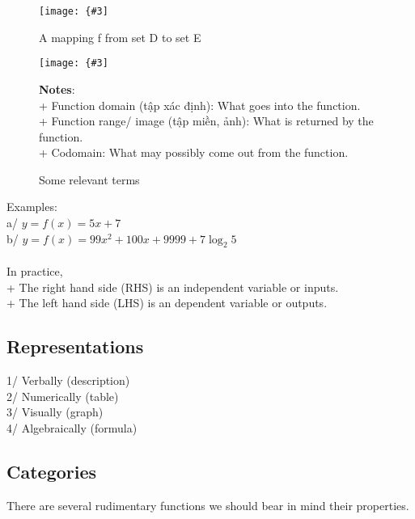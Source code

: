 \documentclass[12pt,a4paper]{article}
\newcommand{\img}[3]{
	\texttt{[image: \{\#3]}}}
\newcommand{\superscript}[1]{^{{#1}}}
\newcommand{\logab}[2]{\log_{#2} {#1}}
\begin{document}
\begin{figure}[h!]
\img{7cm}{6cm}{Picture/Univariate_calculus/Definition/2.png}
\caption{A mapping f from set D to set E}
\end{figure}
\newpage
\begin{figure}[h!]	\img{7cm}{6cm}{Picture/Univariate_calculus/Definition/3.png}
\caption{Some relevant terms}
\textbf{Notes}:\\
+ Function domain (tập xác định): What goes into the function.\\
+ Function range/ image (tập miền, ảnh): What is returned by the function.\\
+ Codomain: What may possibly come out from the function.\\
\end{figure}
\noindent
Examples:\\
a/ $y = f(x) = 5x + 7$\\
b/ $y = f(x) = 99x\superscript{2} + 100x + 9999 + 7\logab{5}{2}$\\ \\ \noindent
In practice,\\
+ The right hand side (RHS) is an independent variable or inputs.\\
+ The left hand side (LHS) is an dependent variable or outputs.\\
\subsection{Representations}			%
1/ Verbally (description)\\
2/ Numerically (table)\\
3/ Visually (graph)\\
4/ Algebraically (formula)\\

\subsection{Categories}					%
There are several rudimentary functions we should bear in mind their properties.\\
\end{document}
